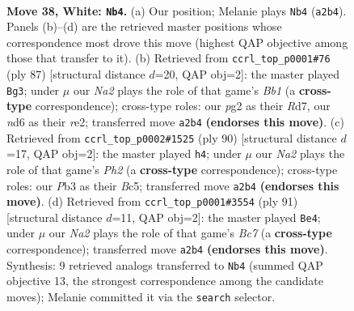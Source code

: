 \documentclass[11pt]{article}
\begin{document}
\clearpage

\begin{figure}[p]\centering
\begin{subfigure}{0.46\textwidth}\centering
\resizebox{\linewidth}{!}{%
\newchessgame
\chessboard[
  setfen={3k4/4b3/3n4/2p5/8/1P6/N2K2p1/8 w - - 0 38},
  showmover=false,
  pgfstyle=straightmove, color=movearrow, markmove={a2-b4}
]}
\caption{}
\end{subfigure}\hfill
\begin{subfigure}{0.46\textwidth}\centering
\resizebox{\linewidth}{!}{%
\newchessgame
\chessboard[
  setfen={1b6/3r4/5p1k/8/P6P/8/2B1R3/1K6 b - - 0 44},
  showmover=false,
  pgfstyle=straightmove, color=movearrow, markmove={b8-g3}
]}
\caption{}
\end{subfigure}
\\[4pt]
\begin{subfigure}{0.46\textwidth}\centering
\resizebox{\linewidth}{!}{%
\newchessgame
\chessboard[
  setfen={8/8/p3b3/2B2k2/8/P4K2/7P/8 w - - 1 46},
  showmover=false,
  pgfstyle=straightmove, color=movearrow, markmove={h2-h4}
]}
\caption{}
\end{subfigure}\hfill
\begin{subfigure}{0.46\textwidth}\centering
\resizebox{\linewidth}{!}{%
\newchessgame
\chessboard[
  setfen={8/5k2/7P/3p4/8/4K3/2bB2P1/8 b - - 8 46},
  showmover=false,
  pgfstyle=straightmove, color=movearrow, markmove={c2-e4}
]}
\caption{}
\end{subfigure}
\caption{\textbf{Move 38, White: \texttt{Nb4}.} (a) Our position; Melanie plays \texttt{Nb4} (\texttt{a2b4}). Panels (b)--(d) are the retrieved master positions whose correspondence most drove this move (highest QAP objective among those that transfer to it). (b) Retrieved from \texttt{ccrl\_top\_p0001\#76} (ply 87) [structural distance $d$=20, QAP obj=2]: the master played \texttt{Bg3}; under $\mu$ our \emph{Na2} plays the role of that game's \emph{Bb1} (a \textbf{cross-type} correspondence); cross-type roles: our \emph{p}g2 as their \emph{R}d7, our \emph{n}d6 as their \emph{r}e2; transferred move \texttt{a2b4} \textbf{(endorses this move)}. (c) Retrieved from \texttt{ccrl\_top\_p0002\#1525} (ply 90) [structural distance $d$=17, QAP obj=2]: the master played \texttt{h4}; under $\mu$ our \emph{Na2} plays the role of that game's \emph{Ph2} (a \textbf{cross-type} correspondence); cross-type roles: our \emph{P}b3 as their \emph{B}c5; transferred move \texttt{a2b4} \textbf{(endorses this move)}. (d) Retrieved from \texttt{ccrl\_top\_p0001\#3554} (ply 91) [structural distance $d$=11, QAP obj=2]: the master played \texttt{Be4}; under $\mu$ our \emph{Na2} plays the role of that game's \emph{Bc7} (a \textbf{cross-type} correspondence); transferred move \texttt{a2b4} \textbf{(endorses this move)}. Synthesis: 9 retrieved analogs transferred to \texttt{Nb4} (summed QAP objective 13, the strongest correspondence among the candidate moves); Melanie committed it via the \texttt{search} selector.}
\label{fig:thought-m74}
\end{figure}
\end{document}
